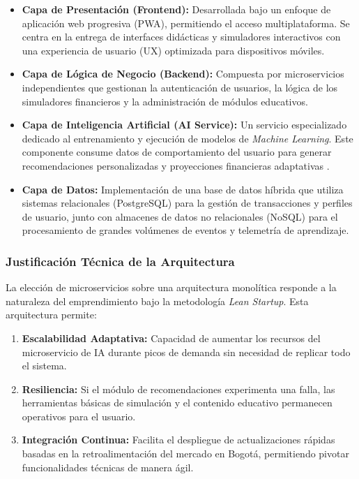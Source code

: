 \begin{itemize}
	\item \textbf{Capa de Presentación (Frontend):} Desarrollada bajo un enfoque de aplicación web progresiva (PWA), permitiendo el acceso multiplataforma. Se centra en la entrega de interfaces didácticas y simuladores interactivos con una experiencia de usuario (UX) optimizada para dispositivos móviles.
	
	\item \textbf{Capa de Lógica de Negocio (Backend):} Compuesta por microservicios independientes que gestionan la autenticación de usuarios, la lógica de los simuladores financieros y la administración de módulos educativos. 
	
	\item \textbf{Capa de Inteligencia Artificial (AI Service):} Un servicio especializado dedicado al entrenamiento y ejecución de modelos de \textit{Machine Learning}. Este componente consume datos de comportamiento del usuario para generar recomendaciones personalizadas y proyecciones financieras adaptativas \parencite{BBVAResearch01}.
	
	\item \textbf{Capa de Datos:} Implementación de una base de datos híbrida que utiliza sistemas relacionales (PostgreSQL) para la gestión de transacciones y perfiles de usuario, junto con almacenes de datos no relacionales (NoSQL) para el procesamiento de grandes volúmenes de eventos y telemetría de aprendizaje.
\end{itemize}

\subsubsection*{Justificación Técnica de la Arquitectura}

La elección de microservicios sobre una arquitectura monolítica responde a la naturaleza del emprendimiento bajo la metodología \textit{Lean Startup}. Esta arquitectura permite:
\begin{enumerate}
	\item \textbf{Escalabilidad Adaptativa:} Capacidad de aumentar los recursos del microservicio de IA durante picos de demanda sin necesidad de replicar todo el sistema.
	\item \textbf{Resiliencia:} Si el módulo de recomendaciones experimenta una falla, las herramientas básicas de simulación y el contenido educativo permanecen operativos para el usuario.
	\item \textbf{Integración Continua:} Facilita el despliegue de actualizaciones rápidas basadas en la retroalimentación del mercado en Bogotá, permitiendo pivotar funcionalidades técnicas de manera ágil.
\end{enumerate}


